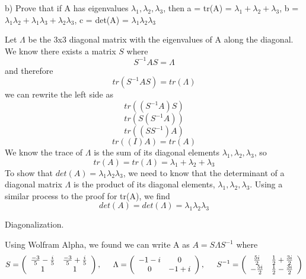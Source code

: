 \documentclass[11pt,answers]{exam}
\begin{document}
\begin{questions}
b) Prove that if A has eigenvalues $\lambda_1,\lambda_2, \lambda_3$, then a = tr(A)  = $\lambda_1 + \lambda_2 + \lambda_3$, b = $\lambda_1\lambda_2 + \lambda_1\lambda_3 + \lambda_2\lambda_3$, c = det(A) = $\lambda_1\lambda_2\lambda_3$

\begin{solution}
Let $\Lambda$ be the 3x3 diagonal matrix with the eigenvalues of A along the diagonal. We know there exists a matrix $S$ where
\begin{equation}
S^{-1}AS = \Lambda
\end{equation}
and therefore 
\begin{equation}
tr(S^{-1}AS) = tr(\Lambda)
\end{equation}
we can rewrite the left side as
\begin{equation}
tr((S^{-1}A)S)
\end{equation}
\begin{equation}
tr(S(S^{-1}A))
\end{equation}
\begin{equation}
tr((SS^{-1})A)
\end{equation}
\begin{equation}
tr((I)A) = tr(A)
\end{equation}
We know the trace of $\Lambda$ is the sum of its diagonal elements $\lambda_1,\lambda_2,\lambda_3$, so 
\begin{equation}
tr(A) = tr(\Lambda) = \lambda_1+\lambda_2+\lambda_3
\end{equation}
To show that $det(A) = \lambda_1\lambda_2\lambda_3$, we need to know that the determinant of a diagonal matrix $\Lambda$ is the product of its diagonal elements, $\lambda_1,\lambda_2,\lambda_3$. Using a similar process to the proof for tr(A), we find
\begin{equation}
det(A) = det(\Lambda) = \lambda_1\lambda_2\lambda_3
\end{equation}
\end{solution}

\item Diagonalization.
\begin{solution}
Using Wolfram Alpha, we found we can write A as $A = S\Lambda S^{-1}$ where 
\[
S = \left(\begin{array}{cc}\frac{-3}{5} - \frac{i}{5} & \frac{-3}{5} + \frac{i}{5}\\1 & 1\end{array}\right), \hbox{\hspace{1.5em}} \Lambda = \left(\begin{array}{cc}-1 - i & 0\\0 & -1 + i \end{array}\right), \hbox{\hspace{1.5em}} S^{-1} = \left(\begin{array}{cc} \frac{5i}{2} & \frac{1}{2} + \frac{3i}{2} \\   -\frac{5i}{2} & \frac{1}{2} - \frac{3i}{2} \end{array}\right)
\]


\end{solution}
\end{questions}
\end{document}
